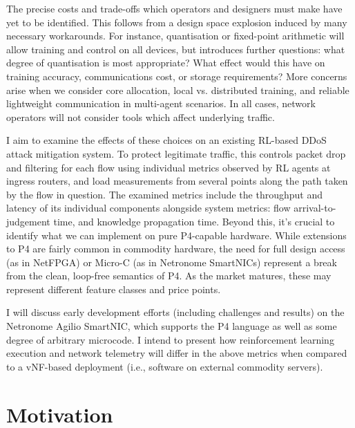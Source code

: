 \documentclass[sigconf,natbib=false]{acmart}
\begin{document}
The precise costs and trade-offs which operators and designers must make have yet to be identified. This follows from a design space explosion induced by many necessary workarounds. For instance, quantisation or fixed-point arithmetic will allow training and control on all devices, but introduces further questions: what degree of quantisation is most appropriate? What effect would this have on training accuracy, communications cost, or storage requirements? More concerns arise when we consider core allocation, local vs. distributed training, and reliable lightweight communication in multi-agent scenarios. In all cases, network operators will not consider tools which affect underlying traffic.

I aim to examine the effects of these choices on an existing RL-based DDoS attack mitigation system. To protect legitimate traffic, this controls packet drop and filtering for each flow using individual metrics observed by RL agents at ingress routers, and load measurements from several points along the path taken by the flow in question. The examined metrics include the throughput and latency of its individual components alongside system metrics: flow arrival-to-judgement time, and knowledge propagation time. Beyond this, it's crucial to identify what we can implement on pure P4-capable hardware. While extensions to P4 are fairly common in commodity hardware, the need for full design access (as in NetFPGA) or Micro-C (as in Netronome SmartNICs) represent a break from the clean, loop-free semantics of P4. As the market matures, these may represent different feature classes and price points.

I will discuss early development efforts (including challenges and results) on the Netronome Agilio SmartNIC, which supports the P4 language as well as some degree of arbitrary microcode. I intend to present how reinforcement learning execution and network telemetry will differ in the above metrics when compared to a vNF-based deployment (i.e., software on external commodity servers).

\section{Motivation}
\end{document}
